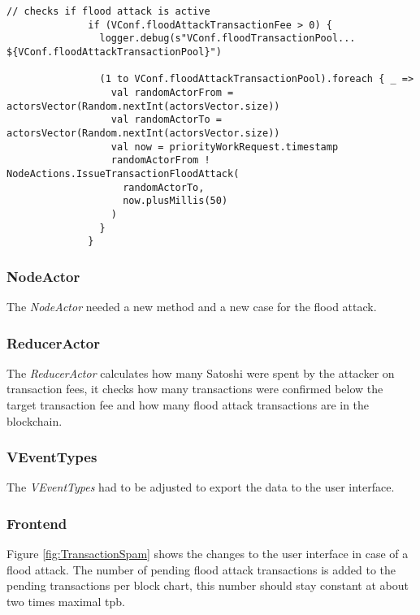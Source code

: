 \begin{minipage}{\linewidth}
\begin{lstlisting}[style=myScalastyle,label=lst:floodAttack1,
caption={caption text}]
              // checks if flood attack is active
              if (VConf.floodAttackTransactionFee > 0) {
                logger.debug(s"VConf.floodTransactionPool... ${VConf.floodAttackTransactionPool}")

                (1 to VConf.floodAttackTransactionPool).foreach { _ =>
                  val randomActorFrom = actorsVector(Random.nextInt(actorsVector.size))
                  val randomActorTo = actorsVector(Random.nextInt(actorsVector.size))
                  val now = priorityWorkRequest.timestamp
                  randomActorFrom ! NodeActions.IssueTransactionFloodAttack(
                    randomActorTo,
                    now.plusMillis(50)
                  )
                }
              }
\end{lstlisting}
\end{minipage}
             
\subsubsection{NodeActor}
The \textit{NodeActor} needed a new method and a new case for the flood attack.

\subsubsection{ReducerActor}
The \textit{ReducerActor} calculates how many Satoshi were spent by the attacker on transaction fees, it checks how many transactions were confirmed below the target transaction fee and how many flood attack transactions are in the blockchain.

\subsubsection{VEventTypes}
The \textit{VEventTypes} had to be adjusted to export the data to the user interface.

\subsubsection{Frontend}
Figure \ref{fig:TransactionSpam} shows the changes to the user interface in case of a flood attack. The number of pending flood attack transactions is added to the pending transactions per block chart, this number should stay constant at about two times maximal tpb.


